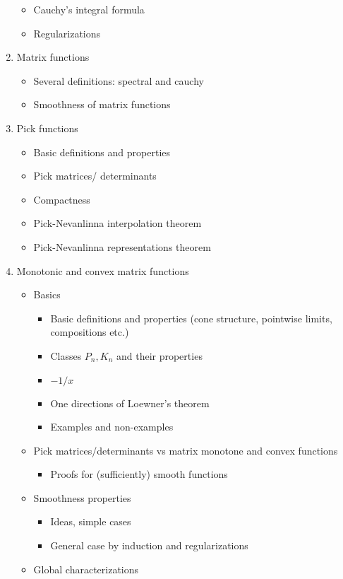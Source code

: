 \begin{enumerate}
\begin{itemize}
			\item Cauchy's integral formula
			\item Regularizations
		\end{itemize}
	\item Matrix functions
		\begin{itemize}
			\item Several definitions: spectral and cauchy
			\item Smoothness of matrix functions
		\end{itemize}
	\item Pick functions
		\begin{itemize}
			\item Basic definitions and properties
			\item Pick matrices/ determinants
			\item Compactness
			\item Pick-Nevanlinna interpolation theorem
			\item Pick-Nevanlinna representations theorem
		\end{itemize}
	\item Monotonic and convex matrix functions
		\begin{itemize}
			\item Basics
				\begin{itemize}
					\item Basic definitions and properties (cone structure, pointwise limits, compositions etc.)
					\item Classes $P_{n}, K_{n}$ and their properties
					\item $-1/x$
					\item One directions of Loewner's theorem
					\item Examples and non-examples
				\end{itemize}
			\item Pick matrices/determinants vs matrix monotone and convex functions
				\begin{itemize}
					\item Proofs for (sufficiently) smooth functions
				\end{itemize}
			\item Smoothness properties
				\begin{itemize}
					\item Ideas, simple cases
					\item General case by induction and regularizations
				\end{itemize}
			\item Global characterizations

\end{itemize}
\end{enumerate}
